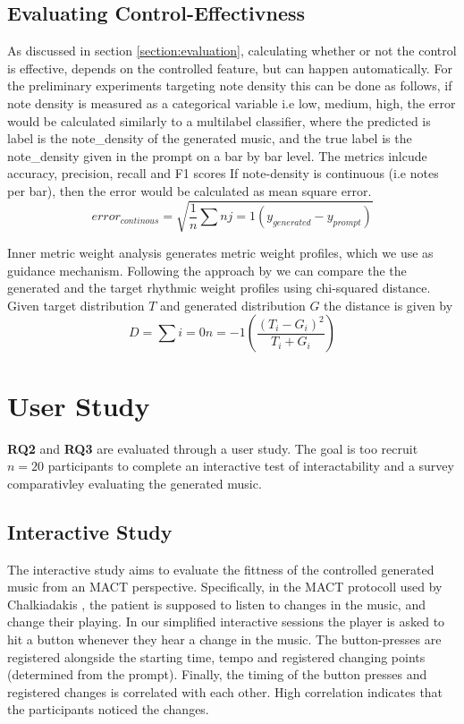 \subsection{Evaluating Control-Effectivness}
As discussed in section \ref{section:evaluation}, calculating whether or not the control is effective, depends on the controlled feature, but can happen automatically. For the preliminary experiments targeting note density this can be done as follows, if note density is measured as a categorical variable i.e low, medium, high, the error would be calculated similarly to a multilabel classifier, where the predicted is label is the note_density of the generated music, and the true label is the note_density given in the prompt on a bar by bar level. The metrics inlcude accuracy, precision, recall and F1 scores If note-density is continuous (i.e notes per bar), then the error would be calculated as mean square error. 
$$
error_{continous} = \sqrt{\frac{1}{n}\sum{n}{j=1}(y_{generated}-y_{prompt})}
$$

Inner metric weight analysis generates metric weight profiles, which we use as guidance mechanism. Following the approach by \cite{Bemman2024} we can compare the the generated and the target rhythmic weight profiles using chi-squared distance.
Given target distribution $T$ and generated distribution $G$ the distance is given by 
$$
D=\sum{i=0}{n=-1}(\frac{(T_i-G_i)^2}{T_i+G_i})
$$


\section{User Study}
\textbf{RQ2} and \textbf{RQ3} are evaluated through a user study. The goal is too recruit $n=20$ participants to complete an interactive test of interactability and a survey comparativley evaluating the generated music. 
\subsection{Interactive Study}
The interactive study aims to evaluate the fittness of the controlled generated music from an MACT perspective. Specifically, in the MACT protocoll used by Chalkiadakis \cite{Chalkiadakis_2022}, the patient is supposed to listen to changes in the music, and change their playing. In our simplified interactive sessions the player is asked to hit a button whenever they hear a change in the music. The button-presses are registered alongside the starting time, tempo and registered changing points (determined from the prompt). Finally, the timing of the button presses and registered changes is correlated with each other. High correlation indicates that the participants noticed the changes. 

